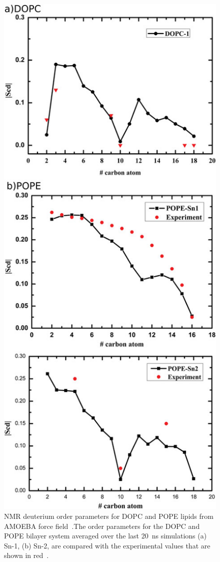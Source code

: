 \documentclass[journal=jpcbfk,manuscript=article,layout=twocolumn]{achemso}
\begin{document}
\begin{figure}[!hbt]
  \centering
  \includegraphics[width=\columnwidth]{../Figures/order_parameter_amoeba.png}
  \caption{NMR deuterium order parameters for DOPC and POPE lipids from AMOEBA
  force field~\cite{chu2018polarizable}.The order parameters for the DOPC and POPE bilayer system averaged over the last 20~ns simulations (a) Sn-1, (b) Sn-2, are compared with the experimental values that are shown in red~\cite{seelig1978molecular,perly1985acyl,shaikh2002monounsaturated}.}
\label{fig:amoebadopc}
\end{figure}
\end{document}
